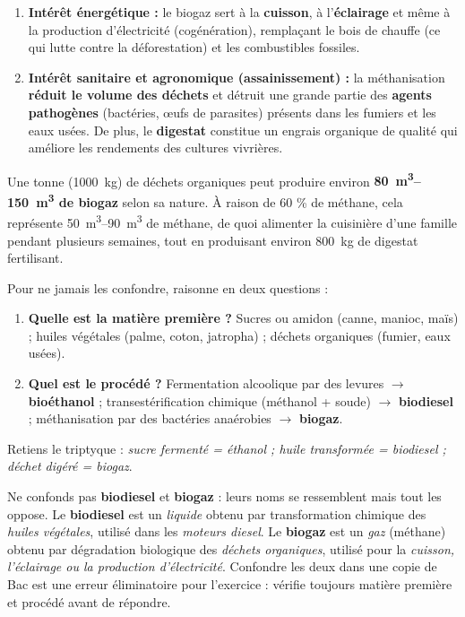 \documentclass[11pt]{article}
\begin{document}
\begin{propriete}
\begin{enumerate}
\item \textbf{Intérêt énergétique :} le biogaz sert à la \textbf{cuisson}, à l'\textbf{éclairage} et même à la production d'électricité (cogénération), remplaçant le bois de chauffe (ce qui lutte contre la déforestation) et les combustibles fossiles.
\item \textbf{Intérêt sanitaire et agronomique (assainissement) :} la méthanisation \textbf{réduit le volume des déchets} et détruit une grande partie des \textbf{agents pathogènes} (bactéries, œufs de parasites) présents dans les fumiers et les eaux usées. De plus, le \textbf{digestat} constitue un engrais organique de qualité qui améliore les rendements des cultures vivrières.
\end{enumerate}
\end{propriete}

\begin{exemplebox}
Une tonne (\SI{1000}{kg}) de déchets organiques peut produire environ \textbf{\SIrange{80}{150}{\cubic\meter} de biogaz} selon sa nature. À raison de 60 \% de méthane, cela représente \SIrange{50}{90}{\cubic\meter} de méthane, de quoi alimenter la cuisinière d'une famille pendant plusieurs semaines, tout en produisant environ \SI{800}{kg} de digestat fertilisant.
\end{exemplebox}

\begin{methode}
Pour ne jamais les confondre, raisonne en deux questions :
\begin{enumerate}
\item \textbf{Quelle est la matière première ?} Sucres ou amidon (canne, manioc, maïs) ; huiles végétales (palme, coton, jatropha) ; déchets organiques (fumier, eaux usées).
\item \textbf{Quel est le procédé ?} Fermentation alcoolique par des levures $\rightarrow$ \textbf{bioéthanol} ; transestérification chimique (méthanol + soude) $\rightarrow$ \textbf{biodiesel} ; méthanisation par des bactéries anaérobies $\rightarrow$ \textbf{biogaz}.
\end{enumerate}
Retiens le triptyque : \emph{sucre fermenté = éthanol ; huile transformée = biodiesel ; déchet digéré = biogaz}.
\end{methode}

\begin{attention}
Ne confonds pas \textbf{biodiesel} et \textbf{biogaz} : leurs noms se ressemblent mais tout les oppose. Le \textbf{biodiesel} est un \emph{liquide} obtenu par transformation chimique des \emph{huiles végétales}, utilisé dans les \emph{moteurs diesel}. Le \textbf{biogaz} est un \emph{gaz} (méthane) obtenu par dégradation biologique des \emph{déchets organiques}, utilisé pour la \emph{cuisson, l'éclairage ou la production d'électricité}. Confondre les deux dans une copie de Bac est une erreur éliminatoire pour l'exercice : vérifie toujours matière première et procédé avant de répondre.
\end{attention}
\end{document}
